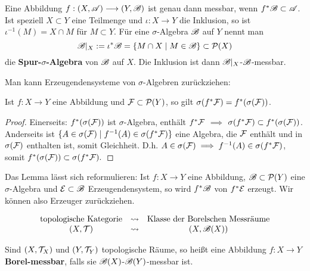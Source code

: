 \begin{definition}
Eine Abbildung $f:(X,\mathscr{A})\longrightarrow (Y,\mathscr{B})$ ist genau dann messbar, wenn $f^*\mathscr{B}\subset\mathscr{A}$. Ist speziell $X\subset Y$ eine Teilmenge und $\iota:X\longrightarrow Y$ die Inklusion, so ist $\iota^{-1}(M)=X\cap M$ für $M\subset Y$. Für eine $\sigma$-Algebra $\mathscr{B}$ auf $Y$ nennt man
$$\mathscr{B}|_X := \iota^*\mathscr{B}=\{M\cap X \mid M \in \mathscr{B}\} \subset \mathcal{P}(X)$$
die \textbf{Spur-$\sigma$-Algebra} von $\mathscr{B}$ auf $X$. Die Inklusion ist dann $\mathscr{B}|_X$-$\mathscr{B}$-messbar.
\end{definition}
Man kann Erzeugendensysteme von $\sigma$-Algebren zurückziehen:
\begin{lemma}
\begin{mdframed}
Ist $f: X \longrightarrow Y$ eine Abbildung und $\mathcal{F} \subset \mathcal{P}(Y)$, so gilt $\sigma(f^*\mathcal{F}) = f^* (\sigma(\mathcal{F}))$.
\end{mdframed}
\begin{proof}
Einerseits: $f^*(\sigma(\mathcal{F}))$ ist $\sigma$-Algebra, enthält $f^*\mathcal{F}$ $\implies$ $\sigma(f^*\mathcal{F}) \subset  f^*(\sigma(\mathcal{F}))$. \\
Anderseits ist
$
\{A \in \sigma(\mathcal{F}) \mid f^{-1}(A) \in \sigma(f^* \mathcal{F}) \}
$ eine Algebra, die $\mathcal{F}$ enthält und in $\sigma(\mathcal{F})$ enthalten ist, somit Gleichheit. D.h. $A\in \sigma(\mathcal{F})\implies f^{-1}(A) \in \sigma(f^*\mathcal{F})$, somit $f^*(\sigma(\mathcal{F}))\subset \sigma(f^*\mathcal{F}).$ %
\end{proof}
Das Lemma lässt sich reformulieren: Ist $f: X \to Y$ eine Abbildung, $\mathscr{B} \subset \mathcal{P}(Y)$ eine $\sigma$-Algebra und $\mathcal{E} \subset \mathscr{B}$ Erzeugendensystem, so wird $f^*\mathscr{B}$ von $f^* \mathcal{E}$ erzeugt. Wir können also Erzeuger zurückziehen.
\end{lemma}
\begin{equation*}
	\begin{array}{ccc}
		\text{topologische Kategorie} & \leadsto & \text{Klasse der Borelschen Messräume} \\
		(X,\mathcal{T}) & \leadsto & (X, \mathscr{B}(X))
	\end{array}
\end{equation*}

\begin{definition}
\begin{mdframed}
Sind $(X,\mathcal{T}_X)$ und $(Y,\mathcal{T}_Y)$ topologische Räume, so heißt eine Abbildung $f:X \longrightarrow Y$ \textbf{Borel-messbar}, falls sie $\mathscr{B}(X)$-$\mathscr{B}(Y)$-messbar ist.
\end{mdframed}
\end{definition}

